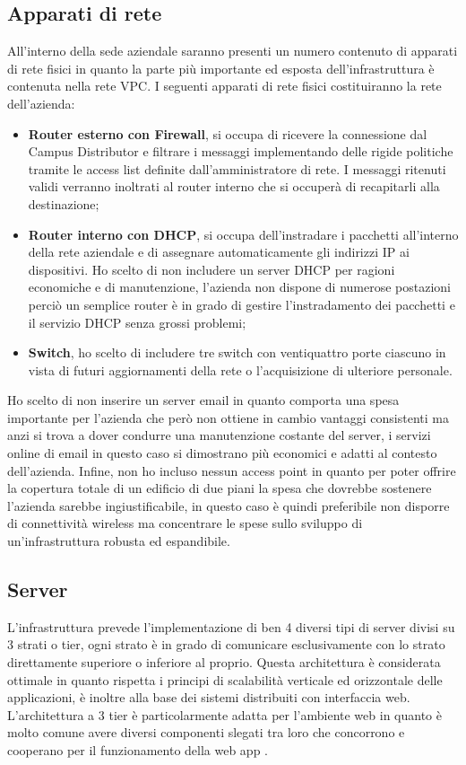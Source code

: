 \subsection{Apparati di rete}
All'interno della sede aziendale saranno presenti un numero contenuto di apparati di rete fisici in quanto la parte più importante ed esposta dell'infrastruttura è contenuta nella rete VPC. I seguenti apparati di rete fisici costituiranno la rete dell'azienda: 
\begin{itemize}
    \item \textbf{Router esterno con Firewall}, si occupa di ricevere la connessione dal Campus Distributor e filtrare i messaggi implementando delle rigide politiche tramite le access list definite dall'amministratore di rete. I messaggi ritenuti validi verranno inoltrati al router interno che si occuperà di recapitarli alla destinazione;
    \item \textbf{Router interno con DHCP}, si occupa dell'instradare i pacchetti all'interno della rete aziendale e di assegnare automaticamente gli indirizzi IP ai dispositivi. Ho scelto di non includere un server DHCP per ragioni economiche e di manutenzione, l'azienda non dispone di numerose postazioni perciò un semplice router è in grado di gestire l'instradamento dei pacchetti e il servizio DHCP senza grossi problemi;
    \item \textbf{Switch}, ho scelto di includere tre switch con ventiquattro porte ciascuno in vista di futuri aggiornamenti della rete o l'acquisizione di ulteriore personale. 
\end{itemize}
Ho scelto di non inserire un server email in quanto comporta una spesa importante per l'azienda che però non ottiene in cambio vantaggi consistenti ma anzi si trova a dover condurre una manutenzione costante del server, i servizi online di email in questo caso si dimostrano più economici e adatti al contesto dell'azienda. Infine, non ho incluso nessun access point in quanto per poter offrire la copertura totale di un edificio di due piani la spesa che dovrebbe sostenere l'azienda sarebbe ingiustificabile, in questo caso è quindi preferibile non disporre di connettività wireless ma concentrare le spese sullo sviluppo di un'infrastruttura robusta ed espandibile. 
\subsection{Server}
L'infrastruttura prevede l'implementazione di ben 4 diversi tipi di server divisi su 3 strati o tier, ogni strato è in grado di comunicare esclusivamente con lo strato direttamente superiore o inferiore al proprio. Questa architettura è considerata ottimale in quanto rispetta i principi di scalabilità verticale ed orizzontale delle applicazioni, è inoltre alla base dei sistemi distribuiti con interfaccia web. L'architettura a 3 tier è particolarmente adatta per l'ambiente web in quanto è molto comune avere diversi componenti slegati tra loro che concorrono e cooperano per il funzionamento della web app \cite{3Tier}. 
\medskip

